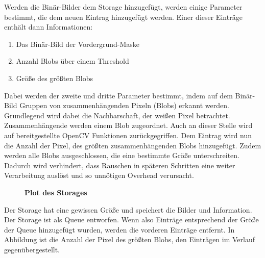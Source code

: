 Werden die Binär-Bilder dem Storage hinzugefügt, werden einige Parameter bestimmt, die dem neuen Eintrag hinzugefügt werden.
Einer dieser Einträge enthält dann Informationen:
\begin{enumerate}
	\item Das Binär-Bild der Vordergrund-Maske
	\item Anzahl Blobs über einem Threshold
	\item Größe des größten Blobs
\end{enumerate}
Dabei werden der zweite und dritte Parameter bestimmt, indem auf dem Binär-Bild Gruppen von zusammenhängenden Pixeln (Blobs) erkannt werden. 
Grundlegend wird dabei die Nachbarschaft, der weißen Pixel betrachtet. Zusammenhängende werden einem Blob zugeordnet. Auch an dieser Stelle wird auf bereitgestellte OpenCV Funktionen zurückgegriffen. Dem Eintrag wird nun die Anzahl der Pixel, des größten zusammenhängenden Blobs hinzugefügt. Zudem werden alle Blobs ausgeschlossen, die eine bestimmte Größe unterschreiten. Dadurch wird verhindert, dass Rauschen in späteren Schritten eine weiter Verarbeitung auslöst und so unnötigen Overhead verursacht.
\begin{figure}[ht]
\centering
{}\qquad
\caption{\textbf{Plot des Storages}}
\label{Fig:blobplot}
\end{figure}

Der Storage hat eine gewissen Größe und speichert die Bilder und Information. Der Storage ist als Queue entworfen. Wenn also Einträge entsprechend der Größe der Queue hinzugefügt wurden, werden die vorderen Einträge entfernt. In Abbildung  ist die Anzahl der Pixel des größten Blobs, den Einträgen im Verlauf gegenübergestellt.

